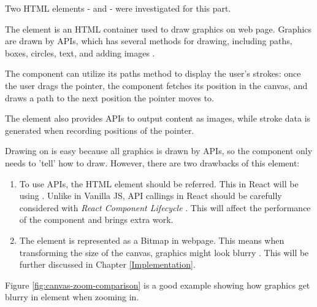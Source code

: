 \documentclass[12pt,twoside]{report}
\begin{document}
Two HTML elements -  and  - were investigated for this part.

The  element is an HTML container used
to draw graphics on web page. Graphics are drawn by APIs, which has several
methods for drawing, including paths, boxes, circles, text, and adding images
\cite{webcanvas}. 

The component can utilize its paths method to display the user's strokes: once the user drags the pointer, the component fetches its position in the canvas, and draws a path to the next position the pointer moves to. 

The  element also provides APIs to output content as images, while stroke data is generated when recording positions of the pointer.

Drawing on  is easy because all graphics is drawn by APIs, so the component only needs to 'tell'  how to draw. However, there are two drawbacks of this element: 
\begin{enumerate}
    \item To use  APIs, the HTML element should be referred. This in React will be using . Unlike in Vanilla JS, API callings in React should be carefully considered with \textit{React Component Lifecycle} \cite{webreactlife}. This will affect the performance of the component and brings extra work.
    \item The  element is represented as a Bitmap in webpage. This means when transforming the size of the canvas, graphics might look blurry \cite{webcanvasvssvg}. This will be further discussed in Chapter \ref{Implementation}.
\end{enumerate}

Figure \ref{fig:canvas-zoom-comparison} is a good example showing how graphics get blurry in  element when zooming in.
\end{document}
